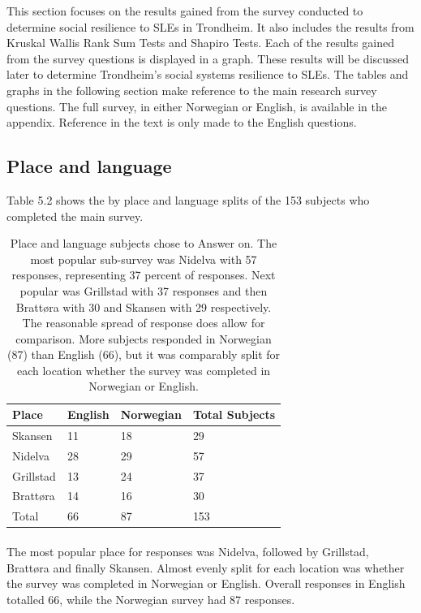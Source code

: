 This section focuses on the results gained from the survey conducted to determine social resilience to SLEs in Trondheim.  It also includes the results from Kruskal Wallis Rank Sum Tests and Shapiro Tests. Each of the results gained from the survey questions is displayed in a graph. These results will be discussed later to determine Trondheim's social systems resilience to SLEs. The tables and graphs in the following section make reference to the main research survey questions. The full survey, in either Norwegian or English, is available in the appendix. Reference in the text is only made to the English questions. 



\subsection{Place and language}
Table 5.2 shows the by place and language splits of the 153 subjects who completed the main survey. 
\begin{table}[H]
    \centering
    \begin{tabular}{|l|l|l|l|}
    \hline
    \textbf{Place}  & \textbf{ English} & \textbf{Norwegian} & \textbf{Total Subjects}  \\ \hline
      Skansen & 11 & 18  & 29    \\ \hline
      Nidelva & 28 & 29 & 57      \\ \hline
      Grillstad & 13 & 24 & 37       \\ \hline
      Brattøra & 14 & 16 & 30     \\ \hline
      Total & 66 & 87 & 153   \\ \hline
     \end{tabular}
    \caption{Place and language subjects chose to Answer on. The most popular sub-survey was Nidelva with 57 responses, representing 37 percent of responses. Next popular was Grillstad with 37 responses and then Brattøra with 30 and Skansen with 29 respectively. The reasonable spread of response does allow for comparison. More subjects responded in Norwegian (87) than English (66), but it was comparably split for each location whether the survey was completed in Norwegian or English. }
    \label{tab:place}
\end{table}
\paragraph{}

The most popular place for responses was Nidelva, followed by Grillstad, Brattøra and finally Skansen. Almost evenly split for each location was whether the survey was completed in Norwegian or English. Overall responses in English totalled 66, while the Norwegian survey had 87 responses.  

